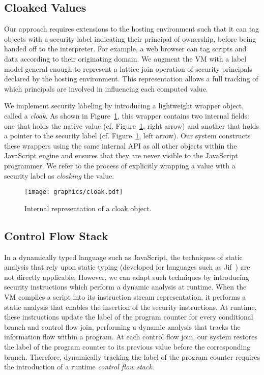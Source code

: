 \documentclass[preprint]{sigplanconf}
\begin{document}
\subsection{Cloaked Values}

Our approach requires extensions to the hosting environment such that it can tag objects with a security label indicating their principal of ownership, before being handed off to the interpreter.
For example, a web browser can tag scripts and data according to their originating domain.
We augment the VM with a label model general enough to represent a lattice join operation of security principals declared by the hosting environment.
This representation allows a full tracking of which principals are involved in influencing each computed value.

We implement security labeling by introducing a lightweight wrapper object, called a \emph{cloak}.
As shown in Figure~\ref{fig:cloak}, this wrapper contains two internal fields: one that holds the native value (cf. Figure~\ref{fig:cloak}, right arrow) and another that holds a pointer to the security label (cf. Figure~\ref{fig:cloak}, left arrow).
Our system constructs these wrappers using the same internal API as all other objects within the JavaScript engine and ensures that they are never visible to the JavaScript programmer.
We refer to the process of explicitly wrapping a value with a security label as \textit{cloaking} the value.

\begin{figure}[ht]
  \centerline{\texttt{[image: graphics/cloak.pdf]}}
  \caption{Internal representation of a cloak object.}
  \label{fig:cloak}
\end{figure}

\subsection{Control Flow Stack}
\label{sec:control-flow-stack}
In a dynamically typed language such as JavaScript, the techniques of static analysis that rely upon static typing (developed for languages such as Jif~\cite{myers2001jif}) are not directly applicable.
However, we can adapt such techniques by introducing security instructions which perform a dynamic analysis at runtime.
When the VM compiles a script into its instruction stream representation, it performs a static analysis that enables the insertion of the security instructions.
At runtime, these instructions update the label of the program counter for every conditional branch and control flow join, performing a dynamic analysis that tracks the information flow within a program.
At each control flow join, our system restores the label of the program counter to its previous value before the corresponding branch.
Therefore, dynamically tracking the label of the program counter requires the introduction of a runtime \textit{control flow stack}.
\end{document}
